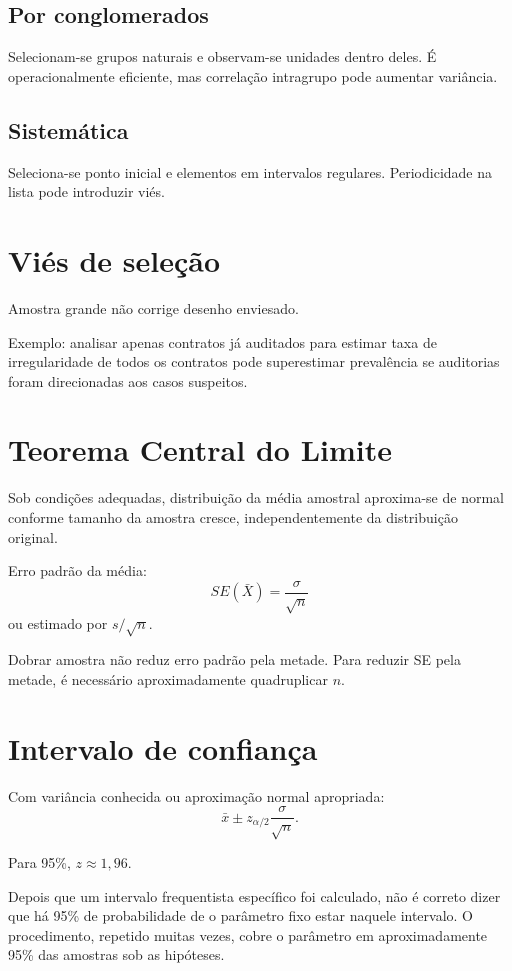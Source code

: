 \subsection{Por conglomerados}

Selecionam-se grupos naturais e observam-se unidades dentro deles. É operacionalmente eficiente, mas correlação intragrupo pode aumentar variância.

\subsection{Sistemática}

Seleciona-se ponto inicial e elementos em intervalos regulares. Periodicidade na lista pode introduzir viés.

\section{Viés de seleção}

Amostra grande não corrige desenho enviesado.

Exemplo: analisar apenas contratos já auditados para estimar taxa de irregularidade de todos os contratos pode superestimar prevalência se auditorias foram direcionadas aos casos suspeitos.

\section{Teorema Central do Limite}

Sob condições adequadas, distribuição da média amostral aproxima-se de normal conforme tamanho da amostra cresce, independentemente da distribuição original.

Erro padrão da média:
\[
SE(\bar X)=\frac{\sigma}{\sqrt{n}}
\]
ou estimado por $s/\sqrt{n}$.

Dobrar amostra não reduz erro padrão pela metade. Para reduzir SE pela metade, é necessário aproximadamente quadruplicar $n$.

\section{Intervalo de confiança}

Com variância conhecida ou aproximação normal apropriada:
\[
\bar{x}\pm z_{\alpha/2}\frac{\sigma}{\sqrt{n}}.
\]

Para 95\%, $z\approx1{,}96$.

\begin{atencao}
Depois que um intervalo frequentista específico foi calculado, não é correto dizer que há 95\% de probabilidade de o parâmetro fixo estar naquele intervalo. O procedimento, repetido muitas vezes, cobre o parâmetro em aproximadamente 95\% das amostras sob as hipóteses.
\end{atencao}

